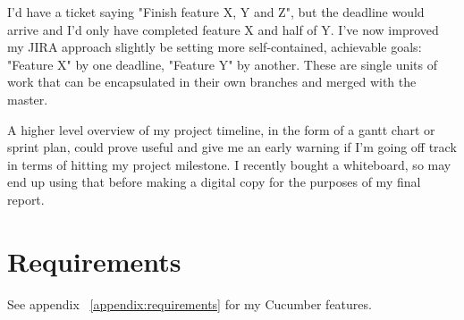 I'd have a ticket saying "Finish feature X, Y and Z", but the deadline would arrive and I'd only have completed feature X and half of Y. I've now improved my JIRA approach slightly be setting more self-contained, achievable goals: "Feature X" by one deadline, "Feature Y" by another. These are single units of work that can be encapsulated in their own branches and merged with the master.

A higher level overview of my project timeline, in the form of a gantt chart or sprint plan, could prove useful and give me an early warning if I'm going off track in terms of hitting my project milestone. I recently bought a whiteboard, so may end up using that before making a digital copy for the purposes of my final report.


\section{Requirements}

See appendix ~\ref{appendix:requirements} for my Cucumber features.